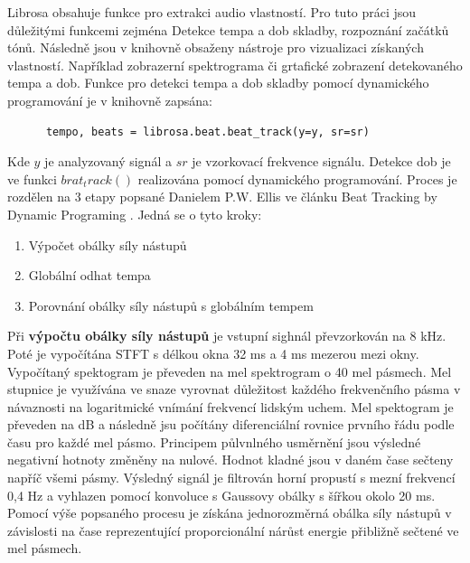     Librosa obsahuje funkce pro extrakci audio vlastností.
    Pro tuto práci jsou důležitými funkcemi zejména Detekce tempa a dob skladby, rozpoznání začátků tónů. Následně jsou v knihovně obsaženy nástroje pro vizualizaci získaných vlastností. Například zobrazerní spektrograma či grtafické zobrazení detekovaného tempa a dob.
    Funkce pro detekci tempa a dob skladby pomocí dynamického programování je v knihovně zapsána:

    \begin{lstlisting}
      tempo, beats = librosa.beat.beat_track(y=y, sr=sr)
    \end{lstlisting}
    
    Kde $ y $ je analyzovaný signál a $ sr $ je vzorkovací frekvence signálu.
    Detekce dob je ve funkci $ brat_track() $ realizována pomocí dynamického programování. Proces je rozdělen na 3 etapy popsané Danielem P.W. Ellis ve článku Beat Tracking by Dynamic Programing \cite{Beat_tracking_by_dynamic_programing}. Jedná se o tyto kroky:

    \smallskip

    \begin{enumerate}
      \item Výpočet obálky síly nástupů
      \item Globální odhat tempa
      \item Porovnání obálky síly nástupů s globálním tempem
    \end{enumerate}

    \smallskip

    Při \textbf{výpočtu obálky síly nástupů} je vstupní sighnál převzorkován na 8 kHz. Poté je vypočítána \acs{STFT} s délkou okna 32 ms a 4 ms mezerou mezi okny. Vypočítaný spektogram je převeden na mel spektrogram o 40 mel pásmech. Mel stupnice je využívána ve snaze vyrovnat důležitost každého frekvenčního pásma v návaznosti na logaritmické vnímání frekvencí lidským uchem. Mel spektogram je převeden na dB a následně jsu počítány diferenciální rovnice prvního řádu podle času pro každé mel pásmo. Principem půlvnlného usměrnění jsou výsledné negativní hotnoty změněny na nulové. Hodnot kladné jsou v daném čase sečteny napříč všemi pásmy. Výsledný signál je filtrován horní propustí s mezní frekvencí 0,4 Hz a vyhlazen pomocí konvoluce s Gaussovy obálky s šířkou okolo 20 ms. Pomocí výše popsaného procesu je získána jednorozměrná obálka síly nástupů v závislosti na čase reprezentující proporcionální nárůst energie přibližně sečtené ve mel pásmech.

